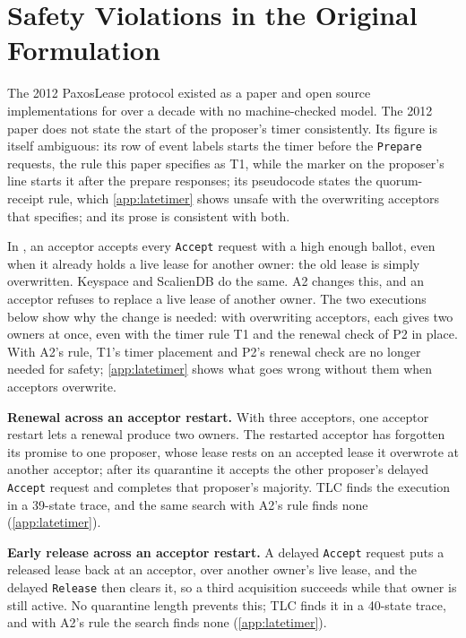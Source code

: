 \documentclass[final,5p,times,twocolumn,number]{elsarticle}
\newcommand{\code}[1]{\texttt{#1}}
\begin{document}
\section{Safety Violations in the Original Formulation}\label{sec:designspace}

The 2012 PaxosLease protocol existed as a paper and open source implementations for over a decade with no machine-checked model.  The 2012 paper \cite{ref1} does not state the start of the proposer's timer consistently.  Its figure is itself ambiguous: its row of event labels starts the timer before the \code{Prepare} requests, the rule this paper specifies as T1, while the marker on the proposer's line starts it after the prepare responses; its pseudocode states the quorum-receipt rule, which \ref{app:latetimer} shows unsafe with the overwriting acceptors that \cite{ref1} specifies; and its prose is consistent with both.

In \cite{ref1}, an acceptor accepts every \code{Accept} request with a high enough ballot, even when it already holds a live lease for another owner: the old lease is simply overwritten.  Keyspace and ScalienDB do the same.  A2 changes this, and an acceptor refuses to replace a live lease of another owner.  The two executions below show why the change is needed: with overwriting acceptors, each gives two owners at once, even with the timer rule T1 and the renewal check of P2 in place.  With A2's rule, T1's timer placement and P2's renewal check are no longer needed for safety; \ref{app:latetimer} shows what goes wrong without them when acceptors overwrite.

\smallskip
\noindent\textbf{Renewal across an acceptor restart.}  With three acceptors, one acceptor restart lets a renewal produce two owners.  The restarted acceptor has forgotten its promise to one proposer, whose lease rests on an accepted lease it overwrote at another acceptor; after its quarantine it accepts the other proposer's delayed \code{Accept} request and completes that proposer's majority.  TLC finds the execution in a 39-state trace, and the same search with A2's rule finds none (\ref{app:latetimer}).

\smallskip
\noindent\textbf{Early release across an acceptor restart.}  A delayed \code{Accept} request puts a released lease back at an acceptor, over another owner's live lease, and the delayed \code{Release} then clears it, so a third acquisition succeeds while that owner is still active.  No quarantine length prevents this; TLC finds it in a 40-state trace, and with A2's rule the search finds none (\ref{app:latetimer}).
\end{document}
